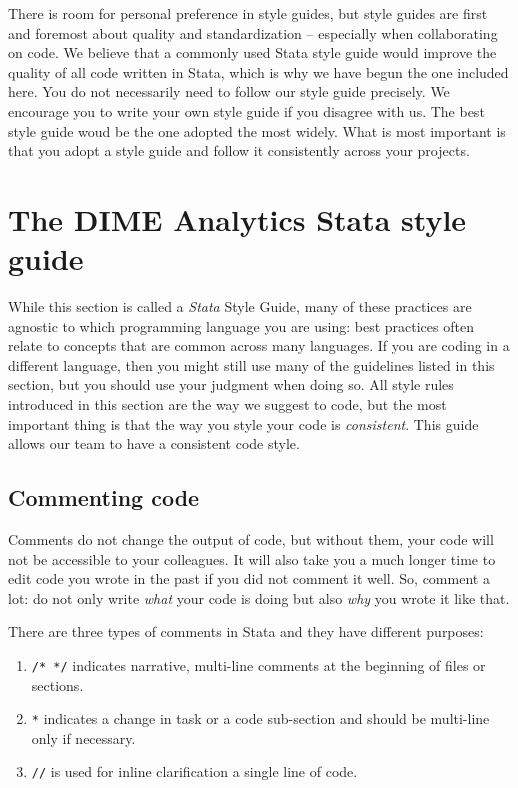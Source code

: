 There is room for personal preference in style guides, but style guides are first and foremost
about quality and standardization -- especially when collaborating on code. We believe that a commonly used Stata style guide
would improve the quality of all code written in Stata, which is why we have begun the one included here. You do not necessarily need to follow our
style guide precisely. We encourage you to write your own style guide if you disagree with us. The best style guide
woud be the one adopted the most widely. What is most important is that you adopt a style guide and follow it consistently across your projects.

\newpage

\section{The DIME Analytics Stata style guide}

While this section is called a \textit{Stata} Style Guide, many of these practices are agnostic to which
programming language you are using: best practices often relate to concepts that are common across many
languages. If you are coding in a different language, then you might still use many of the guidelines
listed in this section, but you should use your judgment when doing so.
All style rules introduced in this section are the way we suggest to code,
but the most important thing is that the way you style your code is \textit{consistent}.
This guide allows our team to have a consistent code style.

\subsection{Commenting code}

Comments do not change the output of code, but without them, your code will not be accessible to your colleagues.
It will also take you a much longer time to edit code you wrote in the past if you did not comment it well.
So, comment a lot: do not only write \textit{what} your code is doing but also \textit{why} you wrote it like that.

There are three types of comments in Stata and they have different purposes:
\begin{enumerate}
  \item \texttt{/* */} indicates narrative, multi-line comments at the beginning of files or sections.
  \item \texttt{*} indicates a change in task or a code sub-section and should be multi-line only if necessary.
  \item \texttt{//} is used for inline clarification a single line of code.
\end{enumerate}

